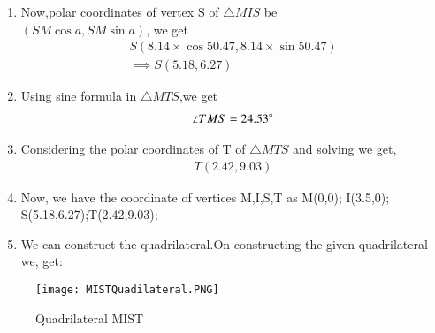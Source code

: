 \documentclass[journal,12pt,twocolumn]{IEEEtran}
\begin{document}
\begin{enumerate}
\item Now,polar coordinates of vertex S of $\triangle MIS$ be
\\$(SM \cos a,SM\sin a)$, we get
\begin{align}
S(8.14\times \cos50.47 ,8.14\times \sin50.47)
\\
\implies S(5.18,6.27)
\end{align}
\item Using sine formula in $\triangle MTS$,we get
\begin{align}
\angle TMS= 24.53\degree
\end{align}
\item Considering the polar coordinates of T of $\triangle MTS$ and solving we get,
\begin{align}
T(2.42,9.03)
\end{align}
    \item Now, we have the coordinate of vertices M,I,S,T as M(0,0); I(3.5,0); S(5.18,6.27);T(2.42,9.03);
    \item We can construct the quadrilateral.On constructing the given quadrilateral we, get:
\end{enumerate}
\begin{figure}[!ht]
\centering
\texttt{[image: MISTQuadilateral.PNG]}
\caption{Quadrilateral MIST}
\label{fig:Quadrilateral MIST}	
\end{figure}
\end{document}
